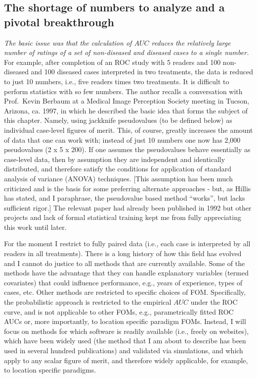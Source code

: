 \documentclass[
]{book}
\begin{document}
\hypertarget{the-shortage-of-numbers-to-analyze-and-a-pivotal-breakthrough}{%
\subsection{The shortage of numbers to analyze and a pivotal breakthrough}\label{the-shortage-of-numbers-to-analyze-and-a-pivotal-breakthrough}}

\emph{The basic issue was that the calculation of \(AUC\) reduces the relatively large number of ratings of a set of non-diseased and diseased cases to a single number.} For example, after completion of an ROC study with 5 readers and 100 non-diseased and 100 diseased cases interpreted in two treatments, the data is reduced to just 10 numbers, i.e., five readers times two treatments. It is difficult to perform statistics with so few numbers. The author recalls a conversation with Prof.~Kevin Berbaum at a Medical Image Perception Society meeting in Tucson, Arizona, ca. 1997, in which he described the basic idea that forms the subject of this chapter. Namely, using jackknife pseudovalues (to be defined below) as individual case-level figures of merit. This, of course, greatly increases the amount of data that one can work with; instead of just 10 numbers one now has 2,000 pseudovalues (2 x 5 x 200). If one assumes the pseudovalues behave essentially as case-level data, then by assumption they are independent and identically distributed, and therefore satisfy the conditions for application of standard analysis of variance (ANOVA) techniques. {[}This assumption has been much criticized and is the basis for some preferring alternate approaches - but, as Hillis has stated, and I paraphrase, the pseudovalue based method ``works'', but lacks sufficient rigor.{]} The relevant paper had already been published in 1992 but other projects and lack of formal statistical training kept me from fully appreciating this work until later.

For the moment I restrict to fully paired data (i.e., each case is interpreted by all readers in all treatments). There is a long history of how this field has evolved and I cannot do justice to all methods that are currently available. Some of the methods \citep{RN1441, RN2013, RN1451} have the advantage that they can handle explanatory variables (termed covariates) that could influence performance, e.g., years of experience, types of cases, etc. Other methods are restricted to specific choices of FOM. Specifically, the probabilistic approach \citep{RN2253, RN2254, RN2351, RN2080} is restricted to the empirical \(AUC\) under the ROC curve, and is not applicable to other FOMs, e.g., parametrically fitted ROC AUCs or, more importantly, to location specific paradigm FOMs. Instead, I will focus on methods for which software is readily available (i.e., freely on websites), which have been widely used (the method that I am about to describe has been used in several hundred publications) and validated via simulations, and which apply to any scalar figure of merit, and therefore widely applicable, for example, to location specific paradigms.
\end{document}
